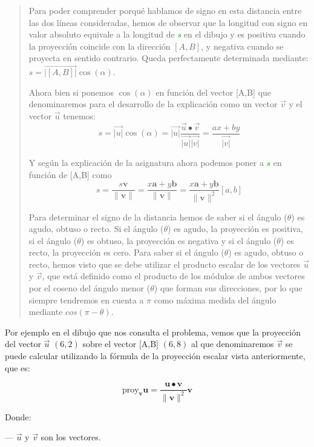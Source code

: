 \documentclass{article}
\begin{document}
\begin{quote}
   Para poder comprender porqué hablamos de signo en esta distancia entre las
   dos líneas consideradas, hemos de observar que
   la longitud con signo en valor absoluto equivale a la longitud 
   de \emph{\textcolor{green}{s}} en el dibujo
     y es positiva cuando la proyección coincide con
la dirección $[A,B]$, y negativa cuando se proyecta en sentido contrario.
 Queda perfectamente determinada mediante:
 $s = \vec{|[A,B]|} \cos (\alpha )$.

Ahora bien si ponemos $\cos(\alpha)$ en función del vector [A,B] que denominaremos 
para el desarrollo de la explicación como un vector $\vec{v}$ y el vector $\vec{u}$  tenemos:
$$s = \vec{|u|} \cos (\alpha ) = \vec{|u|}\frac{\vec{u}
 \bullet \vec{v}}{\vec{|u|} \vec{|v|}} = \frac{ax + by}{\vec{|v|}}$$

 Y según la explicación de la asignatura ahora 
 podemos poner a \textcolor{green}{$s$} en función de [A,B] como 
\[ s = \frac{{s \mathbf{v}}}{{\|\mathbf{v}\|}} 
= \frac{{x\mathbf{a} + y\mathbf{b}}}{{\|\mathbf{v}\|}} 
= \frac{{x\mathbf{a} + y\mathbf{b}}}{{\|\mathbf{v}\|^2}}[a, b] \]

Para determinar el signo de la distancia hemos de saber si el ángulo ($\theta$) es agudo, 
obtuso o recto. Si el ángulo ($\theta$) es agudo, la proyección es positiva,
 si el ángulo ($\theta$) es obtuso, 
la proyección es negativa y si el ángulo ($\theta$) es recto, la proyección es cero. Para saber 
si el ángulo ($\theta$) es agudo, obtuso o recto, 
hemos visto que se debe utilizar el producto escalar 
de los vectores $\vec{u}$ y $\vec{v}$, que está definido
como el producto de los módulos de ambos vectores por el coseno del 
ángulo menor ($\theta$)
que forman sus direcciones, por lo que siempre tendremos en cuenta a $\pi$ como 
máxima medida del ángulo mediante $cos(\pi - \theta)$.
  
\end{quote} 


   \noindent Por ejemplo en el dibujo que nos consulta el problema, vemos que 
   la proyección del vector $\vec{u}$ $(6,2)$
    sobre el vector [A,B] $(6,8)$ al que denominaremos $\vec{v}$ se puede calcular 
   utilizando la fórmula de la proyección escalar vista anteriormente,
    que es:

   $$\text{proy}_{\mathbf{v}} \mathbf{u} = \frac{\mathbf{u} \bullet \mathbf{v}}{\|\mathbf{v}\|^2} \mathbf{v}$$
   

   Donde:

    --- $\vec{u}$ y $\vec{v}$ son los vectores.
\end{document}
